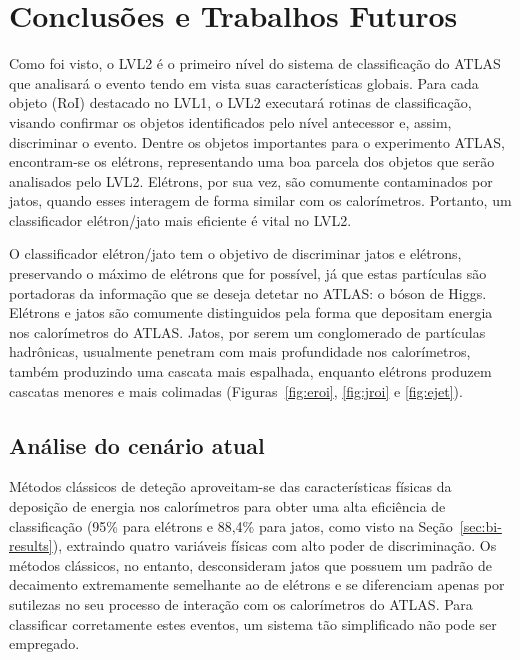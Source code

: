 \typeout{ ====================================================================}
\typeout{ ====================================================================}

\chapter{Conclusões e Trabalhos Futuros}
\label{chap:future}

Como foi visto, o LVL2 é o primeiro nível do sistema de classificação do ATLAS
que analisará o evento tendo em vista suas características globais. Para cada
objeto (RoI) destacado no LVL1, o LVL2 executará rotinas de classificação,
visando confirmar os objetos identificados pelo nível antecessor e, assim,
discriminar o evento. Dentre os objetos importantes para o experimento ATLAS,
encontram-se os elétrons, representando uma boa parcela dos objetos que serão
analisados pelo LVL2. Elétrons, por sua vez, são comumente contaminados por
jatos, quando esses interagem de forma similar com os calorímetros. Portanto,
um classificador elétron/jato mais eficiente é vital no LVL2.

O classificador elétron/jato tem o objetivo de discriminar jatos e elétrons,
preservando o máximo de elétrons que for possível, já que estas partículas são
portadoras da informação que se deseja detetar no ATLAS: o bóson de
Higgs. Elétrons e jatos são comumente distinguidos pela forma que depositam
energia nos calorímetros do ATLAS. Jatos, por serem um conglomerado de
partículas hadrônicas, usualmente penetram com mais profundidade nos
calorímetros, também produzindo uma cascata mais espalhada, enquanto elétrons
produzem cascatas menores e mais colimadas (Figuras~\ref{fig:eroi},
\ref{fig:jroi} e \ref{fig:ejet}).

\section{Análise do cenário atual}

Métodos clássicos de deteção aproveitam-se das características físicas da
deposição de energia nos calorímetros para obter uma alta eficiência de
classificação (95\% para elétrons e 88,4\% para jatos, como visto na
Seção~\ref{sec:bi-results}), extraindo quatro variáveis físicas com alto poder
de discriminação. Os métodos clássicos, no entanto, desconsideram jatos que
possuem um padrão de decaimento extremamente semelhante ao de elétrons e se
diferenciam apenas por sutilezas no seu processo de interação com os
calorímetros do ATLAS. Para classificar corretamente estes eventos, um sistema
tão simplificado não pode ser empregado.

